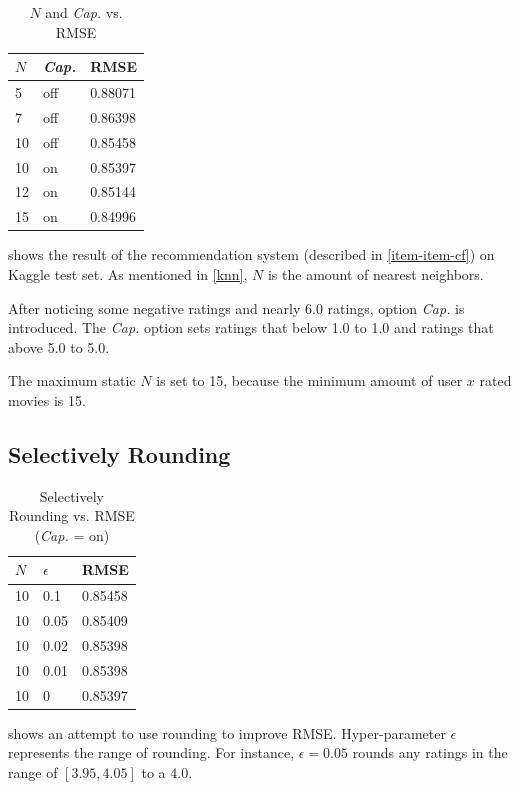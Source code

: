 \documentclass{ece}
\begin{document}
\begin{table}[!htpb]
    \caption[$N$ and \textit{Cap.} vs. RMSE]{$N$ and \textit{Cap.} vs. RMSE}
    \label{tab:table-2}
    \centering
\begin{tabular}{|l|l|l|}
\hline
$N$  & \textit{Cap.} & RMSE    \\ \hline
5  & off  & 0.88071 \\ \hline
7  & off  & 0.86398 \\ \hline
10 & off  & 0.85458 \\ \hline
10 & on   & 0.85397 \\ \hline
12 & on   & 0.85144 \\ \hline
15 & on   & 0.84996 \\ \hline
\end{tabular}
\end{table}

 shows the result of the recommendation system (described in \ref{item-item-cf}) on Kaggle test set.
As mentioned in \ref{knn}, $N$ is the amount of nearest neighbors.

After noticing some negative ratings and nearly 6.0 ratings, option \textit{Cap.} is introduced.
The \textit{Cap.} option sets ratings that below 1.0 to 1.0 and ratings that above 5.0 to 5.0.

The maximum static $N$ is set to 15, because the minimum amount of user $x$ rated movies is 15.

\subsection{Selectively Rounding}

\begin{table}[h]
    \caption[Selectively Rounding vs. RMSE]{Selectively Rounding vs. RMSE (\textit{Cap.} = on)}
    \label{tab:table-3}
    \centering
\begin{tabular}{|l|l|l|}
\hline
$N$  & $\epsilon$ & RMSE    \\ \hline
10 & 0.1     & 0.85458 \\ \hline
10 & 0.05    & 0.85409 \\ \hline
10 & 0.02    & 0.85398 \\ \hline
10 & 0.01    & 0.85398 \\ \hline
10 & 0       & 0.85397 \\ \hline
\end{tabular}
\end{table}

 shows an attempt to use rounding to improve RMSE. 
Hyper-parameter $\epsilon$ represents the range of rounding. For instance, $\epsilon=0.05$ rounds any ratings in the range of $[3.95, 4.05]$ to a 4.0.
\end{document}
